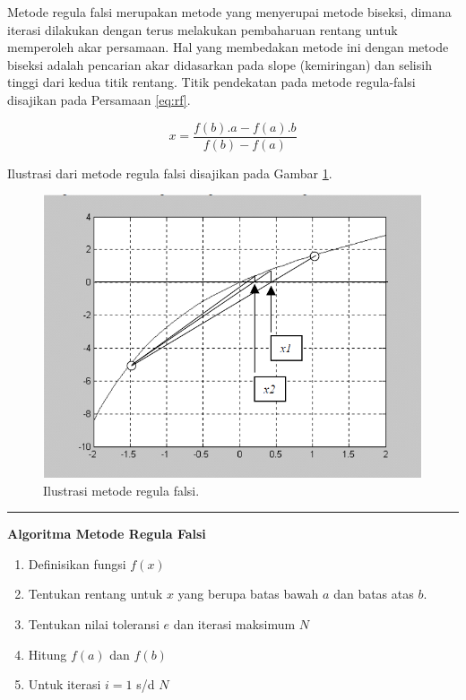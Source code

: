 \documentclass[]{book}
\providecommand{\tightlist}{%
  \setlength{\itemsep}{0pt}\setlength{\parskip}{0pt}}
\theoremstyle{definition}
\theoremstyle{definition}
\theoremstyle{definition}
\theoremstyle{remark}
\begin{document}
Metode regula falsi merupakan metode yang menyerupai metode biseksi, dimana iterasi dilakukan dengan terus melakukan pembaharuan rentang untuk memperoleh akar persamaan. Hal yang membedakan metode ini dengan metode biseksi adalah pencarian akar didasarkan pada slope (kemiringan) dan selisih tinggi dari kedua titik rentang. Titik pendekatan pada metode regula-falsi disajikan pada Persamaan \eqref{eq:rf}.

\begin{equation}
x=\frac{f\left(b\right).a-f\left(a\right).b}{f\left(b\right)-f\left(a\right)}
  \label{eq:rf}
\end{equation}

Ilustrasi dari metode regula falsi disajikan pada Gambar \ref{fig:regula}.

\begin{figure}

{\centering \includegraphics[width=0.8\linewidth]{./images/regula} 

}

\caption{Ilustrasi metode regula falsi.}\label{fig:regula}
\end{figure}

\begin{center}\rule{0.5\linewidth}{\linethickness}\end{center}

\textbf{Algoritma Metode Regula Falsi}

\begin{enumerate}
\def\labelenumi{\arabic{enumi}.}
\tightlist
\item
  Definisikan fungsi \(f\left(x \right)\)
\item
  Tentukan rentang untuk \(x\) yang berupa batas bawah \(a\) dan batas atas \(b\).
\item
  Tentukan nilai toleransi \(e\) dan iterasi maksimum \(N\)
\item
  Hitung \(f\left(a \right)\) dan \(f\left(b \right)\)
\item
  Untuk iterasi \(i=1\) s/d \(N\)
\end{enumerate}
\end{document}
